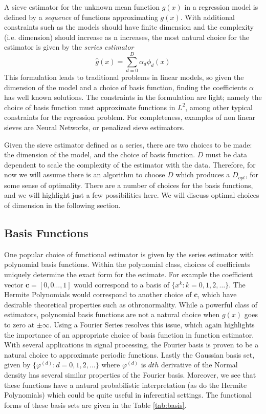 \documentclass[12pt]{article}  %
\begin{document}
A sieve estimator for the unknown mean function $g(x)$ in a regression model is defined by a \textit{sequence} of functions approximating $g(x)$. With additional constraints such as the models should have finite dimension and the complexity (i.e. dimension) should increase as n increases, the most natural choice for the estimator is given by the \textit{series estimator} 
$$ \hat{g}(x) = \sum_{d=0}^{D} \alpha_{d} \phi_{d}(x)$$ 
This formulation leads to traditional problems in linear models, so given the dimension of the model and a choice of basis function, finding the coefficients $\alpha$ has well known solutions. The constraints in the formulation are light; namely the choice of basis function must approximate functions in $L^2$, among other typical constraints for the regression problem.  For completeness, examples of non linear sieves are Neural Networks, or penalized sieve estimators\cite{Chen}. 

Given the sieve estimator defined as a series, there are two choices to be made: the dimension of the model, and the choice of basis function.  $D$ must be data dependent to scale the complexity of the estimator with the data. Therefore, for now we will assume there is an algorithm to choose $D$ which produces a $D_{opt}$, for some sense of optimality. There are a number of choices for the basis functions, and we will highlight just a few possibilities here. We will discuss optimal choices of dimension in the following section. 

\subsection{Basis Functions}

One popular choice of functional estimator is given by the series estimator with polynomial basis functions. Within the polynomial class, choices of coefficients uniquely determine the exact form for the estimate. For example the coefficient vector $\textbf{c} = [0,0 \ldots, 1]$ would correspond to a basis of $\{x^{k}: k = 0,1,2,\ldots\}$. The Hermite Polynomials would correspond to another choice of $\textbf{c}$, which have desirable theoretical properties such as othronormality. While a powerful class of estimators, polynomial basis functions are not a natural choice when $g(x)$ goes to zero at $\pm \infty$. Using a Fourier Series resolves this issue, which again highlights the importance of an appropriate choice of basis function in function estimator. With several applications in signal processing, the Fourier basis is proven to be a natural choice to approximate periodic functions. Lastly the Gaussian basis set, given by $\{\varphi^{(d)}:d= 0,1,2,\dots\}$ where $\varphi^{(d)}$ is $dth$ derivative of the Normal density has several similar properties of the Fourier basis. Moreover, we see that these functions have a natural probabilistic interpretation (as do the Hermite Polynomials) which could be quite useful in inferential settings. The functional forms of these basis sets are given in the Table \ref{tab:basis}. 
\end{document}
